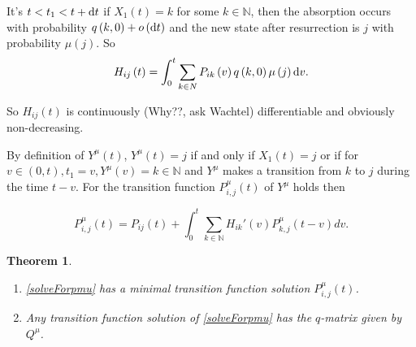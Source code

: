 \documentclass[12pt,a4paper]{scrartcl}
\newtheorem{theorem}{Theorem}[section]
\numberwithin{equation}{section}
\newcommand{\N}{\mathbb{N}} %
\begin{document}

It's $ t < t_1 < t + \textnormal{d}t $ if $X_1\left(t\right) = k$ for some $k \in \N$, then the absorption occurs with probability $ q\left(k,0\right) + o\left(\textnormal{d}t\right) $ and the new state after resurrection is $j$ with probability $\mu\left(j\right)$. So
$$ H_{ij}\left(t\right) = \int_0^t \sum_{k \in N} P_{ik}\left(v\right) q\left(k,0\right) \mu\left(j\right) \textnormal{d}v. $$ 

So $ H_{ij}\left(t\right) $ is continuously (Why??, ask Wachtel) differentiable and obviously non-decreasing.


By definition of $ Y^{\mu}\left(t\right) $, $ Y^{\mu}\left(t\right) = j$ if and only if $X_1\left(t\right) = j $ or if for $ v \in \left(0,t\right) , t_1 = v, Y^{\mu}\left(v\right) = k \in \N$ and $Y^{\mu}$ makes a transition from  $ k $ to $ j $ during the time $t-v$.
For the transition function $P_{i,j}^{\mu}\left(t\right)$ of $ Y^{\mu} $ holds then

\begin{equation}
P_{i,j}^{\mu}\left(t\right) = P_{ij}\left(t\right) + \int_0^t \sum_{k \in \N} H_{ik}'\left(v\right) P_{k,j}^{\mu}\left(t-v\right) dv.
\label{solveForpmu}
\end{equation}

\begin{theorem}
\begin{enumerate}
\item \eqref{solveForpmu} has a minimal transition function solution $ P_{i,j}^{\mu}\left(t\right) $.
\item Any transition function solution of \eqref{solveForpmu} has the $q$-matrix given by $Q^{\mu}$. 

\end{enumerate}
\end{theorem}
\end{document}
